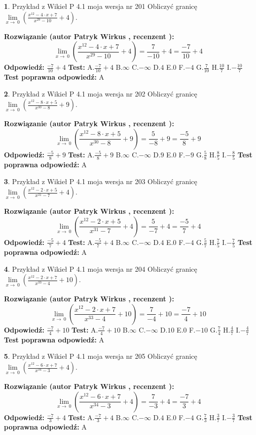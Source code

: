 \documentclass[12pt, a4paper]{article}
\theoremstyle{definition} %
\newtheorem{zad}{}
\newcommand{\zadStart}[1]{\begin{zad}#1\newline}
\newcommand{\zadStop}{\end{zad}}
\newcommand{\rozwStart}[2]{\noindent \textbf{Rozwiązanie (autor #1 , recenzent #2): }\newline}
\newcommand{\rozwStop}{\newline}
\newcommand{\odpStart}{\noindent \textbf{Odpowiedź:}\newline}
\newcommand{\odpStop}{\newline}
\newcommand{\testStart}{\noindent \textbf{Test:}\newline}
\newcommand{\testStop}{\newline}
\newcommand{\kluczStart}{\noindent \textbf{Test poprawna odpowiedź:}\newline}
\newcommand{\kluczStop}{\newline}
\begin{document}
\zadStart{Przykład z Wikieł P 4.1 moja wersja nr 201}
Obliczyć granicę $\lim\limits_{x\to\ 0}(\frac{x^{12}-4 \cdot x +7}{x^{29}-10}+4)$.
\zadStop
\rozwStart{Patryk Wirkus}{}
$$\lim\limits_{x\to\ 0}(\frac{x^{12}-4 \cdot x +7}{x^{29}-10}+4)=\frac{7}{-10}+4=\frac{-7}{10}+4$$
\rozwStop
\odpStart
$\frac{-7}{10}+4$
\odpStop
\testStart
A.$\frac{-7}{10}+4$
B.$\infty$
C.$-\infty$
D.$4$
E.$0$
F.$-4$
G.$\frac{7}{10}$
H.$\frac{10}{7}$
I.$-\frac{10}{7}$
\testStop
\kluczStart
A
\kluczStop



\zadStart{Przykład z Wikieł P 4.1 moja wersja nr 202}
Obliczyć granicę $\lim\limits_{x\to\ 0}(\frac{x^{12}-8 \cdot x +5}{x^{30}-8}+9)$.
\zadStop
\rozwStart{Patryk Wirkus}{}
$$\lim\limits_{x\to\ 0}(\frac{x^{12}-8 \cdot x +5}{x^{30}-8}+9)=\frac{5}{-8}+9=\frac{-5}{8}+9$$
\rozwStop
\odpStart
$\frac{-5}{8}+9$
\odpStop
\testStart
A.$\frac{-5}{8}+9$
B.$\infty$
C.$-\infty$
D.$9$
E.$0$
F.$-9$
G.$\frac{5}{8}$
H.$\frac{8}{5}$
I.$-\frac{8}{5}$
\testStop
\kluczStart
A
\kluczStop



\zadStart{Przykład z Wikieł P 4.1 moja wersja nr 203}
Obliczyć granicę $\lim\limits_{x\to\ 0}(\frac{x^{12}-2 \cdot x +5}{x^{31}-7}+4)$.
\zadStop
\rozwStart{Patryk Wirkus}{}
$$\lim\limits_{x\to\ 0}(\frac{x^{12}-2 \cdot x +5}{x^{31}-7}+4)=\frac{5}{-7}+4=\frac{-5}{7}+4$$
\rozwStop
\odpStart
$\frac{-5}{7}+4$
\odpStop
\testStart
A.$\frac{-5}{7}+4$
B.$\infty$
C.$-\infty$
D.$4$
E.$0$
F.$-4$
G.$\frac{5}{7}$
H.$\frac{7}{5}$
I.$-\frac{7}{5}$
\testStop
\kluczStart
A
\kluczStop



\zadStart{Przykład z Wikieł P 4.1 moja wersja nr 204}
Obliczyć granicę $\lim\limits_{x\to\ 0}(\frac{x^{12}-2 \cdot x +7}{x^{33}-4}+10)$.
\zadStop
\rozwStart{Patryk Wirkus}{}
$$\lim\limits_{x\to\ 0}(\frac{x^{12}-2 \cdot x +7}{x^{33}-4}+10)=\frac{7}{-4}+10=\frac{-7}{4}+10$$
\rozwStop
\odpStart
$\frac{-7}{4}+10$
\odpStop
\testStart
A.$\frac{-7}{4}+10$
B.$\infty$
C.$-\infty$
D.$10$
E.$0$
F.$-10$
G.$\frac{7}{4}$
H.$\frac{4}{7}$
I.$-\frac{4}{7}$
\testStop
\kluczStart
A
\kluczStop



\zadStart{Przykład z Wikieł P 4.1 moja wersja nr 205}
Obliczyć granicę $\lim\limits_{x\to\ 0}(\frac{x^{12}-6 \cdot x +7}{x^{34}-3}+4)$.
\zadStop
\rozwStart{Patryk Wirkus}{}
$$\lim\limits_{x\to\ 0}(\frac{x^{12}-6 \cdot x +7}{x^{34}-3}+4)=\frac{7}{-3}+4=\frac{-7}{3}+4$$
\rozwStop
\odpStart
$\frac{-7}{3}+4$
\odpStop
\testStart
A.$\frac{-7}{3}+4$
B.$\infty$
C.$-\infty$
D.$4$
E.$0$
F.$-4$
G.$\frac{7}{3}$
H.$\frac{3}{7}$
I.$-\frac{3}{7}$
\testStop
\kluczStart
A
\kluczStop
\end{document}
